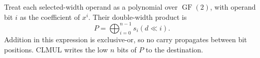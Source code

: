 Treat each selected-width operand as a polynomial over \(\operatorname{GF}(2)\), with operand bit \(i\) as the coefficient of \(x^i\). Their double-width product is
\[
  P = \bigoplus_{i=0}^{n-1} s_i (d \ll i) .
\]
Addition in this expression is exclusive-or, so no carry propagates between bit positions. CLMUL writes the low \(n\) bits of \(P\) to the destination.
